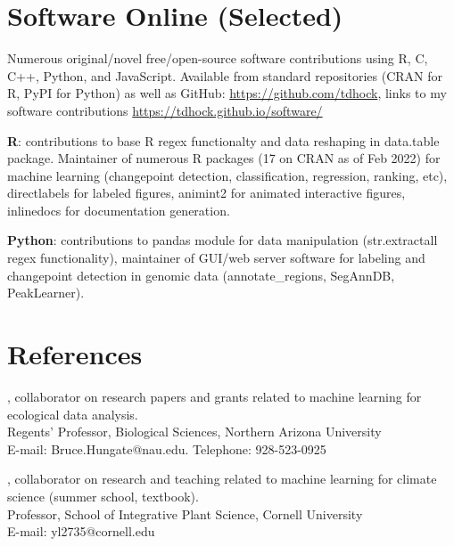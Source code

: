 \documentclass[margin,line]{res}
\begin{document}
\begin{resume}
\section{\sc Software Online (Selected)} 

Numerous original/novel free/open-source software contributions using R, C, C++,
Python, and JavaScript. Available from standard repositories (CRAN for
R, PyPI for Python) as well as GitHub:
\url{https://github.com/tdhock}, links to my software contributions
\url{https://tdhock.github.io/software/}

{\bf R}: contributions to base R regex functionalty and data reshaping
in data.table package. Maintainer of numerous R packages (17 on CRAN
as of Feb 2022) for machine learning (changepoint detection,
classification, regression, ranking, etc), directlabels for labeled
figures, animint2 for animated interactive figures, inlinedocs for
documentation generation.

{\bf Python}: contributions to pandas module for data manipulation
(str.extractall regex functionality), maintainer of GUI/web server
software for labeling and changepoint detection in genomic data
(annotate\_regions, SegAnnDB, PeakLearner).



\section{\sc References}
 
, collaborator on research papers and grants related to machine learning for ecological data analysis. \\
Regents' Professor, Biological Sciences, Northern Arizona University\\
E-mail: Bruce.Hungate@nau.edu. Telephone: 928-523-0925

, collaborator on research and teaching related to machine learning for climate science (summer school, textbook).\\
Professor, School of Integrative Plant Science, Cornell University\\
E-mail: yl2735@cornell.edu


\end{resume}
\end{document}
